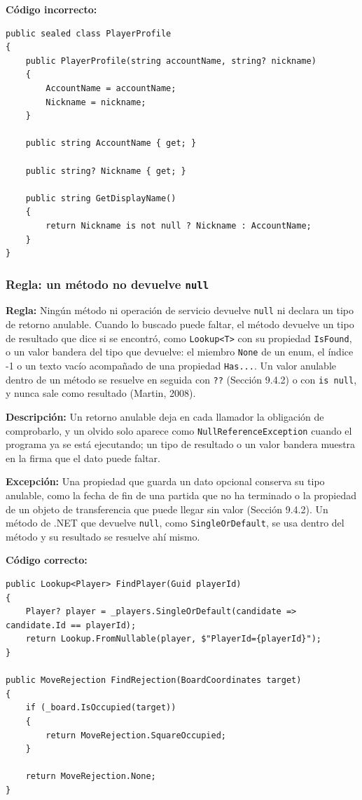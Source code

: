\textbf{Código incorrecto:}
\begin{lstlisting}[style=csharpstyle]
public sealed class PlayerProfile
{
    public PlayerProfile(string accountName, string? nickname)
    {
        AccountName = accountName;
        Nickname = nickname;
    }

    public string AccountName { get; }

    public string? Nickname { get; }

    public string GetDisplayName()
    {
        return Nickname is not null ? Nickname : AccountName;
    }
}
\end{lstlisting}

\subsubsection{Regla: un método no devuelve \texttt{null}}

\textbf{Regla:} Ningún método ni operación de servicio devuelve \texttt{null} ni declara un tipo de retorno anulable. Cuando lo buscado puede faltar, el método devuelve un tipo de resultado que dice si se encontró, como \texttt{Lookup<T>} con su propiedad \texttt{IsFound}, o un valor bandera del tipo que devuelve: el miembro \texttt{None} de un enum, el índice -1 o un texto vacío acompañado de una propiedad \texttt{Has...}. Un valor anulable dentro de un método se resuelve en seguida con \texttt{??} (Sección 9.4.2) o con \texttt{is null}, y nunca sale como resultado (Martin, 2008).

\textbf{Descripción:} Un retorno anulable deja en cada llamador la obligación de comprobarlo, y un olvido solo aparece como \texttt{NullReferenceException} cuando el programa ya se está ejecutando; un tipo de resultado o un valor bandera muestra en la firma que el dato puede faltar.

\textbf{Excepción:} Una propiedad que guarda un dato opcional conserva su tipo anulable, como la fecha de fin de una partida que no ha terminado o la propiedad de un objeto de transferencia que puede llegar sin valor (Sección 9.4.2). Un método de .NET que devuelve \texttt{null}, como \texttt{SingleOrDefault}, se usa dentro del método y su resultado se resuelve ahí mismo.

\textbf{Código correcto:}
\begin{lstlisting}[style=csharpstyle,basicstyle=\ttfamily\scriptsize]
public Lookup<Player> FindPlayer(Guid playerId)
{
    Player? player = _players.SingleOrDefault(candidate => candidate.Id == playerId);
    return Lookup.FromNullable(player, $"PlayerId={playerId}");
}

public MoveRejection FindRejection(BoardCoordinates target)
{
    if (_board.IsOccupied(target))
    {
        return MoveRejection.SquareOccupied;
    }

    return MoveRejection.None;
}
\end{lstlisting}

